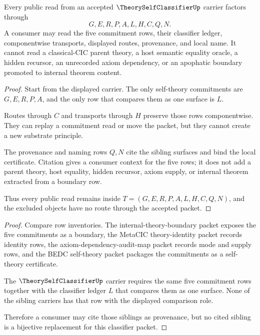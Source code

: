 \begin{theorem}
\label{thm:theory-self-classifier-nonescape}
Every public read from an accepted $\TheorySelfClassifierUp$ carrier factors through
$$
G,E,R,P,A,L,H,C,Q,N.
$$
A consumer may read the five commitment rows, their classifier ledger, componentwise transports, displayed routes, provenance, and local name. It cannot read a classical-CIC parent theory, a host semantic equality oracle, a hidden recursor, an unrecorded axiom dependency, or an apophatic boundary promoted to internal theorem content.
\end{theorem}
\begin{proof}
Start from the displayed carrier. The only self-theory commitments are $G,E,R,P,A$, and the only row that compares them as one surface is $L$.

Routes through $C$ and transports through $H$ preserve those rows componentwise. They can replay a commitment read or move the packet, but they cannot create a new substrate principle.

The provenance and naming rows $Q,N$ cite the sibling surfaces and bind the local certificate. Citation gives a consumer context for the five rows; it does not add a parent theory, host equality, hidden recursor, axiom supply, or internal theorem extracted from a boundary row.

Thus every public read remains inside $T=(G,E,R,P,A,L,H,C,Q,N)$, and the excluded objects have no route through the accepted packet.
\end{proof}

\begin{theorem}
\label{thm:theory-self-classifier-sibling-independence}
\end{theorem}
\begin{proof}
Compare row inventories. The internal-theory-boundary packet exposes the five commitments as a boundary, the MetaCIC theory-identity packet records identity rows, the axiom-dependency-audit-map packet records mode and supply rows, and the BEDC self-theory packet packages the commitments as a self-theory certificate.

The $\TheorySelfClassifierUp$ carrier requires the same five commitment rows together with the classifier ledger $L$ that compares them as one surface. None of the sibling carriers has that row with the displayed comparison role.

Therefore a consumer may cite those siblings as provenance, but no cited sibling is a bijective replacement for this classifier packet.
\end{proof}

